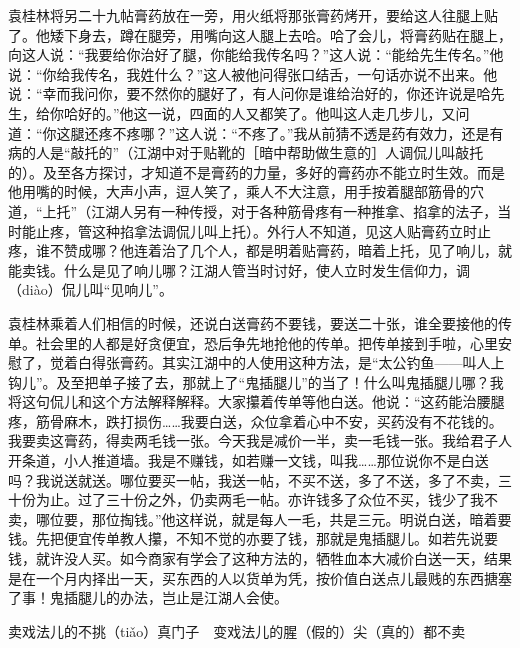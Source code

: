 \documentclass[12pt,UTF8]{ctexbook}
\begin{document}
袁桂林将另二十九帖膏药放在一旁，用火纸将那张膏药烤开，要给这人往腿上贴了。他矮下身去，蹲在腿旁，用嘴向这人腿上去哈。哈了会儿，将膏药贴在腿上，向这人说：“我要给你治好了腿，你能给我传名吗？”这人说：“能给先生传名。”他说：“你给我传名，我姓什么？”这人被他问得张口结舌，一句话亦说不出来。他说：“幸而我问你，要不然你的腿好了，有人问你是谁给治好的，你还许说是哈先生，给你哈好的。”他这一说，四面的人又都笑了。他叫这人走几步儿，又问道：“你这腿还疼不疼哪？”这人说：“不疼了。”我从前猜不透是药有效力，还是有病的人是“敲托的”（江湖中对于贴靴的［暗中帮助做生意的］人调侃儿叫敲托的）。及至各方探讨，才知道不是膏药的力量，多好的膏药亦不能立时生效。而是他用嘴的时候，大声小声，逗人笑了，乘人不大注意，用手按着腿部筋骨的穴道，“上托”（江湖人另有一种传授，对于各种筋骨疼有一种推拿、掐拿的法子，当时能止疼，管这种掐拿法调侃儿叫上托）。外行人不知道，见这人贴膏药立时止疼，谁不赞成哪？他连着治了几个人，都是明着贴膏药，暗着上托，见了响儿，就能卖钱。什么是见了响儿哪？江湖人管当时讨好，使人立时发生信仰力，调（diào）侃儿叫“见响儿”。

袁桂林乘着人们相信的时候，还说白送膏药不要钱，要送二十张，谁全要接他的传单。社会里的人都是好贪便宜，恐后争先地抢他的传单。把传单接到手啦，心里安慰了，觉着白得张膏药。其实江湖中的人使用这种方法，是“太公钓鱼——叫人上钩儿”。及至把单子接了去，那就上了“鬼插腿儿”的当了！什么叫鬼插腿儿哪？我将这句侃儿和这个方法解释解释。大家攥着传单等他白送。他说：“这药能治腰腿疼，筋骨麻木，跌打损伤……我要白送，众位拿着心中不安，买药没有不花钱的。我要卖这膏药，得卖两毛钱一张。今天我是减价一半，卖一毛钱一张。我给君子人开条道，小人推道墙。我是不赚钱，如若赚一文钱，叫我……那位说你不是白送吗？我说送就送。哪位要买一帖，我送一帖，不买不送，多了不送，多了不卖，三十份为止。过了三十份之外，仍卖两毛一帖。亦许钱多了众位不买，钱少了我不卖，哪位要，那位掏钱。”他这样说，就是每人一毛，共是三元。明说白送，暗着要钱。先把便宜传单教人攥，不知不觉的亦要了钱，那就是鬼插腿儿。如若先说要钱，就许没人买。如今商家有学会了这种方法的，牺牲血本大减价白送一天，结果是在一个月内择出一天，买东西的人以货单为凭，按价值白送点儿最贱的东西搪塞了事！鬼插腿儿的办法，岂止是江湖人会使。





卖戏法儿的不挑（tiǎo）真门子　变戏法儿的腥（假的）尖（真的）都不卖
\end{document}
